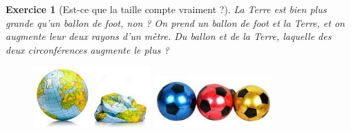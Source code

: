 \documentclass[12pt]{article}
\theoremstyle{break}
\newtheorem{exo}{Exercice}
\begin{document}
\begin{exo}[Est-ce que la taille compte vraiment ?]
La Terre est bien plus grande qu'un ballon de foot, non ? On prend un ballon de foot et la Terre, et on augmente leur deux rayons d'un mètre. Du ballon et de la Terre, laquelle des deux circonférences augmente le plus ?

\begin{figure}[h!]
	\centering
    \includegraphics[width=0.4\textwidth]{images/Terre.jpg}
    \includegraphics[width=0.4\textwidth]{images/BallonFoot.jpg}
\end{figure}
\end{exo}
\end{document}
